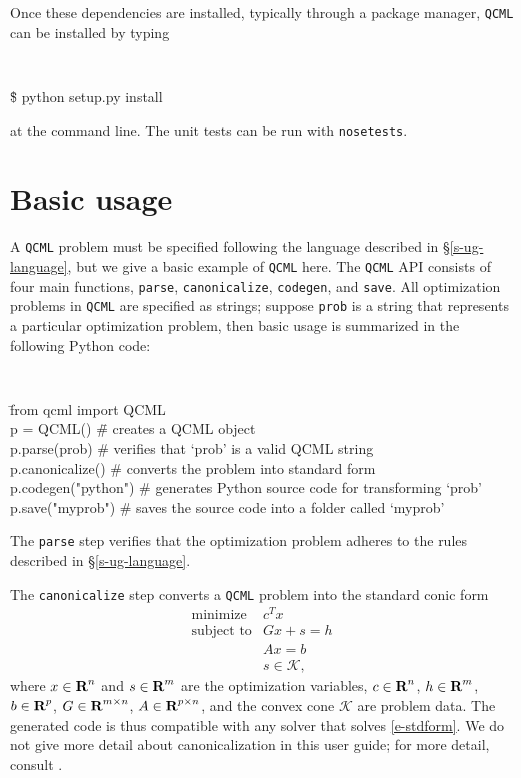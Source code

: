 \documentclass[11pt]{article}
\def\qcml{\texttt{QCML}\xspace}
\newcommand{\reals}{{\mbox{\bf R}}}
\begin{document}
Once these dependencies are installed, typically through a package manager,
\qcml can be installed by typing
{\tt
\begin{tabbing}
  \qquad \= \$ python setup.py install
\end{tabbing}
}
\noindent at the command line. The unit tests can be run with {\tt nosetests}.

\section{Basic usage}
A \qcml problem must be specified following the language described in 
\S\ref{s-ug-language}, but we give a basic example of \qcml here. The \qcml
API consists of four main functions, {\tt parse}, {\tt canonicalize},
{\tt codegen}, and {\tt save}. All optimization problems in \qcml are
specified as strings; suppose {\tt prob} is a string that represents a
particular optimization problem, then basic usage is summarized
in the following Python code:
{\tt
\begin{tabbing}
  \qquad \= from qcml import QCML \\
  \> p = QCML() \qquad \qquad \qquad \= \# creates a QCML object \\
  \> p.parse(prob) \> \# verifies that `prob' is a valid QCML string \\
  \> p.canonicalize() \> \# converts the problem into standard form \\
  \> p.codegen("python") \> \# generates Python source code for transforming `prob' \\
  \> p.save("myprob") \> \# saves the source code into a folder called `myprob'
\end{tabbing}
}
\noindent The {\tt parse} step verifies that the optimization problem adheres
to the rules described in \S\ref{s-ug-language}.

The {\tt canonicalize} step converts a \qcml problem into the
standard conic form 
\begin{equation}
  \label{e-stdform}
\begin{array}{ll}
  \mbox{minimize} & c^Tx \\
  \mbox{subject to} & Gx + s = h \\
  & Ax = b\\
  & s \in \mathcal{K},
\end{array}
\end{equation}
where $x \in \reals^n$ and $s \in \reals^m$ are the optimization variables, 
$c \in \reals^n$, $h \in \reals^m$, $b \in \reals^p$, $G \in \reals^{m\times n}$,
$A \in \reals^{p \times n}$, and the convex cone $\mathcal{K}$ are problem 
data. The generated code is thus compatible with any solver that solves 
\eqref{e-stdform}. We do not give more detail about canonicalization in this
user guide; for more detail, consult \cite{CVX, GB:08, CPD:13}.
\end{document}
